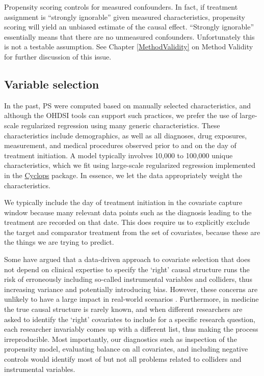 \documentclass[11pt]{book}
\let\BeginKnitrBlock\begin \let\EndKnitrBlock\end
\begin{document}
Propensity scoring controls for measured confounders. In fact, if
treatment assignment is ``strongly ignorable'' given measured
characteristics, propensity scoring will yield an unbiased estimate of
the causal effect. ``Strongly ignorable'' essentially means that there
are no unmeasured confounders. Unfortunately this is not a testable
assumption. See Chapter \ref{MethodValidity} on Method Validity for
further discussion of this issue.

\subsection{Variable selection}\label{variable-selection}

In the past, PS were computed based on manually selected
characteristics, and although the OHDSI tools can support such
practices, we prefer the use of large-scale regularized regression using
many generic characteristics. \citep{tian_2018} These characteristics
include demographics, as well as all diagnoses, drug exposures,
measurement, and medical procedures observed prior to and on the day of
treatment initiation. A model typically involves 10,000 to 100,000
unique characteristics, which we fit using large-scale regularized
regression \citep{suchard_2013} implemented in the
\href{https://ohdsi.github.io/Cyclops/}{Cyclops} package. In essence, we
let the data appropriately weight the characteristics.

\BeginKnitrBlock{rmdimportant}
We typically include the day of treatment initiation in the covariate
capture window because many relevant data points such as the diagnosis
leading to the treatment are recorded on that date. This does require us
to explicitly exclude the target and comparator treatment from the set
of covariates, because these are the things we are trying to predict.
\EndKnitrBlock{rmdimportant}

Some have argued that a data-driven approach to covariate selection that
does not depend on clinical expertise to specify the `right' causal
structure runs the risk of erroneously including so-called instrumental
variables and colliders, thus increasing variance and potentially
introducing bias. \citep{hernan_2002} However, these concerns are
unlikely to have a large impact in real-world scenarios
\citep{schneeweiss_2018}. Furthermore, in medicine the true causal
structure is rarely known, and when different researchers are asked to
identify the `right' covariates to include for a specific research
question, each researcher invariably comes up with a different list,
thus making the process irreproducible. Most importantly, our
diagnostics such as inspection of the propensity model, evaluating
balance on all covariates, and including negative controls would
identify most of but not all problems related to colliders and
instrumental variables.
\end{document}
